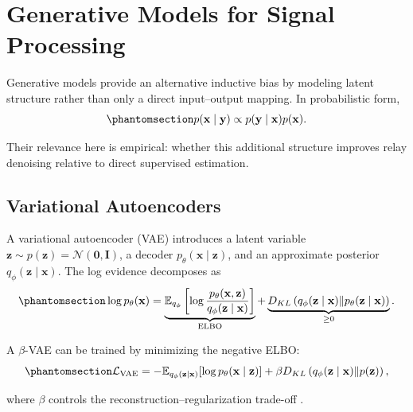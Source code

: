 \section{Generative Models for Signal Processing}\label{sec:generative-models-for-signal-processing}

Generative models provide an alternative inductive bias by modeling latent structure rather than only a direct input--output mapping. In probabilistic form,
\begin{equation}\protect\phantomsection\label{eq:bayes-rule}
p(\mathbf{x}\mid\mathbf{y})
\propto
p(\mathbf{y}\mid\mathbf{x})p(\mathbf{x}).
\end{equation}

Their relevance here is empirical: whether this additional structure improves relay denoising relative to direct supervised estimation.

\subsection{Variational Autoencoders}\label{sec:variational-autoencoders}

A variational autoencoder (VAE) \cite{KingmaWelling2014VAE} introduces a latent variable
\(\mathbf{z}\sim p(\mathbf{z})=\mathcal{N}(\mathbf{0},\mathbf{I})\), a decoder \(p_\theta(\mathbf{x}\mid\mathbf{z})\), and an approximate posterior \(q_\phi(\mathbf{z}\mid\mathbf{x})\). The log evidence decomposes as
\begin{equation}\protect\phantomsection\label{eq:vae-elbo}
\log p_\theta(\mathbf{x})
=
\underbrace{
\mathbb{E}_{q_\phi}
\left[
\log
\frac{p_\theta(\mathbf{x},\mathbf{z})}
{q_\phi(\mathbf{z}\mid\mathbf{x})}
\right]}_{\mathrm{ELBO}}
+
\underbrace{
D_{KL}
\left(
q_\phi(\mathbf{z}\mid\mathbf{x})
\|
p_\theta(\mathbf{z}\mid\mathbf{x})
\right)}_{\geq 0}.
\end{equation}

A \(\beta\)-VAE can be trained by minimizing the negative ELBO:
\begin{equation}\protect\phantomsection\label{eq:vae-loss}
\mathcal{L}_{\text{VAE}}
=
-
\mathbb{E}_{q_\phi(\mathbf{z}\mid\mathbf{x})}
[\log p_\theta(\mathbf{x}\mid\mathbf{z})]
+
\beta
D_{KL}
\left(
q_\phi(\mathbf{z}\mid\mathbf{x})
\|
p(\mathbf{z})
\right),
\end{equation}
where \(\beta\) controls the reconstruction--regularization trade-off \cite{Higgins2017betaVAE}.

